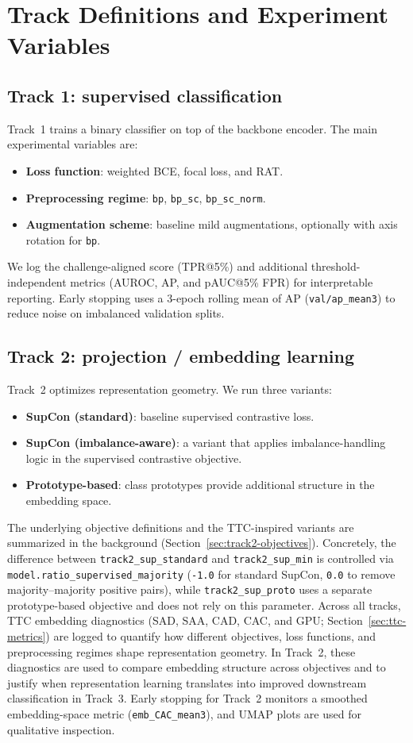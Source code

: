 \section{Track Definitions and Experiment Variables}
\label{sec:track-definitions}
\subsection{Track 1: supervised classification}
Track~1 trains a binary classifier on top of the backbone encoder. The main experimental variables are:
\begin{itemize}
  \item \textbf{Loss function}: weighted BCE, focal loss, and RAT.
  \item \textbf{Preprocessing regime}: \texttt{bp}, \texttt{bp\_sc}, \texttt{bp\_sc\_norm}.
  \item \textbf{Augmentation scheme}: baseline mild augmentations, optionally with axis rotation for \texttt{bp}.
\end{itemize}
We log the challenge-aligned score (TPR@5\%) and additional threshold-independent metrics (AUROC, AP, and pAUC@5\% FPR) for interpretable reporting.
Early stopping uses a 3-epoch rolling mean of AP (\texttt{val/ap\_mean3}) to reduce noise on imbalanced validation splits.

\subsection{Track 2: projection / embedding learning}
Track~2 optimizes representation geometry. We run three variants:
\begin{itemize}
  \item \textbf{SupCon (standard)}: baseline supervised contrastive loss.
  \item \textbf{SupCon (imbalance-aware)}: a variant that applies imbalance-handling logic in the supervised contrastive objective.
  \item \textbf{Prototype-based}: class prototypes provide additional structure in the embedding space.
\end{itemize}
The underlying objective definitions and the TTC-inspired variants are summarized in the background (Section~\ref{sec:track2-objectives}).
Concretely, the difference between \texttt{track2\_sup\_standard} and \texttt{track2\_sup\_min} is controlled via \texttt{model.ratio\_supervised\_majority} (\texttt{-1.0} for standard SupCon, \texttt{0.0} to remove majority--majority positive pairs), while \texttt{track2\_sup\_proto} uses a separate prototype-based objective and does not rely on this parameter.
Across all tracks, TTC embedding diagnostics (SAD, SAA, CAD, CAC, and GPU; Section~\ref{sec:ttc-metrics}) are logged to quantify how different objectives, loss functions, and preprocessing regimes shape representation geometry.
In Track~2, these diagnostics are used to compare embedding structure across objectives and to justify when representation learning translates into improved downstream classification in Track~3.
Early stopping for Track~2 monitors a smoothed embedding-space metric (\texttt{emb\_CAC\_mean3}), and UMAP plots are used for qualitative inspection.

